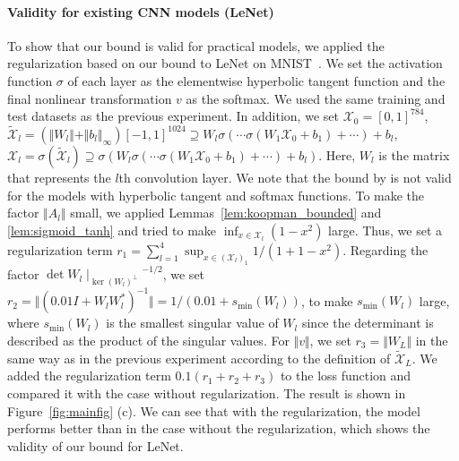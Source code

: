 \documentclass[twoside]{article}
\def\mcl#1{\mathcal{#1}}
\def\opn{\operatorname}
\begin{document}
\paragraph{Validity for existing CNN models (LeNet)}
To show that our bound is valid for practical models, we applied the regularization based on our bound to LeNet on MNIST~\citep{lecun98}.
We set the activation function $\sigma$ of each layer as the elementwise hyperbolic tangent function and the final nonlinear transformation $v$ as the softmax.
We used the same training and test datasets as the previous experiment.
In addition, we set $\mcl{X}_0=[0,1]^{784}$, $\tilde{\mcl{X}}_l=(\Vert W_l\Vert +\Vert b_l\Vert_{\infty})[-1,1]^{1024}\supseteq W_l\sigma(\cdots\sigma(W_1\mcl{X}_0+b_1)+\cdots)+b_l$, $\mcl{X}_l=\sigma(\tilde{\mcl{X}}_l)\supseteq \sigma(W_l\sigma(\cdots\sigma(W_1\mcl{X}_0+b_1)+\cdots)+b_l)$.
Here, $W_l$ is the matrix that represents the $l$th convolution layer.
We note that the bound by \citet{hashimoto2024koopmanbased} is not valid for the models with hyperbolic tangent and softmax functions.
To make the factor $\Vert A_l\Vert$ small, we applied Lemmas~\ref{lem:koopman_bounded} and \ref{lem:sigmoid_tanh} and tried to make $\inf_{x\in\mcl{X}_l}(1-x^2)$ large.
Thus, we set a regularization term $r_1=\sum_{l=1}^4\sup_{x\in (\mcl{X}_l)_1}1/(1+1-x^2)$.
Regarding the factor $\det{W_l\mid_{\opn{ker}(W_l)^{\perp}}}^{-1/2}$, we set $r_2=\Vert (0.01I+W_lW_l^*)^{-1}\Vert=1/(0.01+s_{\opn{min}}(W_l))$, to make $s_{\opn{min}}(W_l)$ large, where $s_{\opn{min}}(W_l)$ is the smallest singular value of $W_l$ since the determinant is described as the product of the singular values. 
For $\Vert v\Vert$, we set $r_3=\Vert W_L\Vert$ in the same way as in the previous experiment according to the definition of $\tilde{\mcl{X}}_L$.
We added the regularization term $0.1(r_1+r_2+r_3)$ to the loss function and compared it with the case without regularization.
The result is shown in Figure~\ref{fig:mainfig} (c).
We can see that with the regularization, the model performs better than in the case without the regularization, which shows the validity of our bound for LeNet.
\end{document}
